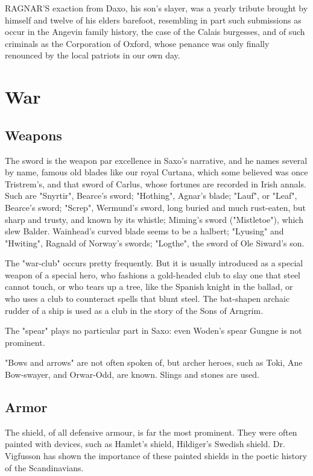 \documentclass[10pt,a4paper]{report}
\begin{document}
RAGNAR'S exaction from Daxo, his son's slayer, was a yearly tribute brought by himself and twelve of his elders barefoot, resembling in part such submissions as occur in the Angevin family history, the case of the Calais burgesses, and of such criminals as the Corporation of Oxford, whose penance was only finally renounced by the local patriots in our own day.


\chapter{War}

\section{Weapons}
The sword is the weapon par excellence in Saxo's narrative, and he names several by name, famous old blades like our royal Curtana, which some believed was once Tristrem's, and that sword of Carlus, whose fortunes are recorded in Irish annals. Such are "Snyrtir", Bearce's sword; "Hothing", Agnar's blade; "Lauf", or "Leaf", Bearce's sword; "Screp", Wermund's sword, long buried and much rust-eaten, but sharp and trusty, and known by its whistle; Miming's sword ("Mistletoe"), which slew Balder. Wainhead's curved blade seems to be a halbert; "Lyusing" and "Hwiting", Ragnald of Norway's swords; "Logthe", the sword of Ole Siward's son.

The "war-club" occurs pretty frequently. But it is usually introduced as a special weapon of a special hero, who fashions a gold-headed club to slay one that steel cannot touch, or who tears up a tree, like the Spanish knight in the ballad, or who uses a club to counteract spells that blunt steel. The bat-shapen archaic rudder of a ship is used as a club in the story of the Sons of Arngrim.

The "spear" plays no particular part in Saxo: even Woden's spear Gungne is not prominent.

"Bows and arrows" are not often spoken of, but archer heroes, such as Toki, Ane Bow-swayer, and Orwar-Odd, are known. Slings and stones are used.

\section{Armor}
The shield, of all defensive armour, is far the most prominent. They were often painted with devices, such as Hamlet's shield, Hildiger's Swedish shield. Dr. Vigfusson has shown the importance of these painted shields in the poetic history of the Scandinavians.
\end{document}

